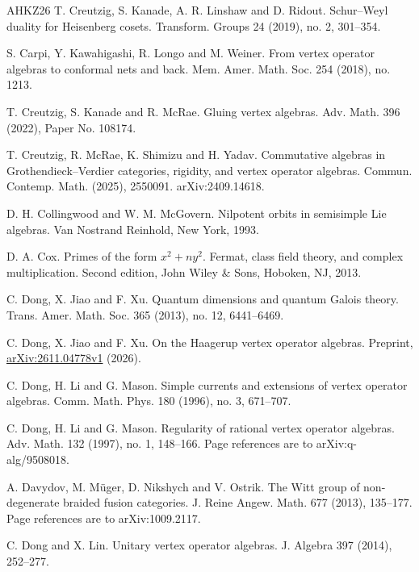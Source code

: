 \documentclass[leqno]{article}
\numberwithin{equation}{section}
\begin{document}
\begin{thebibliography}{AHKZ26}
T. Creutzig, S. Kanade, A. R. Linshaw and D. Ridout.
\newblock Schur--Weyl duality for Heisenberg cosets.
\newblock Transform. Groups 24 (2019), no. 2, 301--354.

S. Carpi, Y. Kawahigashi, R. Longo and M. Weiner.
\newblock From vertex operator algebras to conformal nets and back.
\newblock Mem. Amer. Math. Soc. 254 (2018), no. 1213.

T. Creutzig, S. Kanade and R. McRae.
\newblock Gluing vertex algebras.
\newblock Adv. Math. 396 (2022), Paper No. 108174.

T. Creutzig, R. McRae, K. Shimizu and H. Yadav.
\newblock Commutative algebras in Grothendieck--Verdier categories, rigidity, and vertex operator algebras.
\newblock Commun. Contemp. Math. (2025), 2550091. arXiv:2409.14618.

D. H. Collingwood and W. M. McGovern.
\newblock Nilpotent orbits in semisimple Lie algebras.
\newblock Van Nostrand Reinhold, New York, 1993.

D. A. Cox.
\newblock Primes of the form $x^2+ny^2$. Fermat, class field theory, and complex multiplication.
\newblock Second edition, John Wiley \& Sons, Hoboken, NJ, 2013.

C. Dong, X. Jiao and F. Xu.
\newblock Quantum dimensions and quantum Galois theory.
\newblock Trans. Amer. Math. Soc. 365 (2013), no. 12, 6441--6469.

%
C. Dong, X. Jiao and F. Xu.
\newblock On the Haagerup vertex operator algebras.
\newblock Preprint, \href{https://arxiv.org/abs/2611.04778v1}{arXiv:2611.04778v1} (2026).

C. Dong, H. Li and G. Mason.
\newblock Simple currents and extensions of vertex operator algebras.
\newblock Comm. Math. Phys. 180 (1996), no. 3, 671--707.

C. Dong, H. Li and G. Mason.
\newblock Regularity of rational vertex operator algebras.
\newblock Adv. Math. 132 (1997), no. 1, 148--166. Page references are to arXiv:q-alg/9508018.

A. Davydov, M. Müger, D. Nikshych and V. Ostrik.
\newblock The Witt group of non-degenerate braided fusion categories.
\newblock J. Reine Angew. Math. 677 (2013), 135--177. Page references are to arXiv:1009.2117.

C. Dong and X. Lin.
\newblock Unitary vertex operator algebras.
\newblock J. Algebra 397 (2014), 252--277.


\end{thebibliography}
\end{document}
